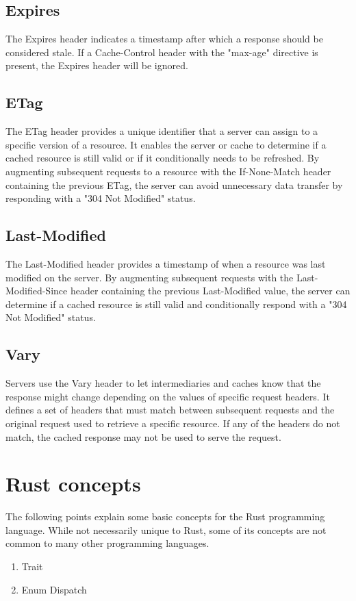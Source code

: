 \subsection{Expires} The Expires header indicates a timestamp after which a response should be considered stale. If a Cache-Control header with the "max-age" directive is present, the Expires header will be ignored\cite{rfc9111}.

\subsection{ETag} The ETag header provides a unique identifier that a server can assign to a specific version of a resource. It enables the server or cache to determine if a cached resource is still valid or if it conditionally needs to be refreshed. By augmenting subsequent requests to a resource with the If-None-Match header containing the previous ETag, the server can avoid unnecessary data transfer by responding with a "304 Not Modified" status\cite{rfc9111}.

\subsection{Last-Modified} The Last-Modified header provides a timestamp of when a resource was last modified on the server. By augmenting subsequent requests with the Last-Modified-Since header containing the previous Last-Modified value, the server can determine if a cached resource is still valid and conditionally respond with a "304 Not Modified" status\cite{rfc9111}.

\subsection{Vary} Servers use the Vary header to let intermediaries and caches know that the response might change depending on the values of specific request headers. It defines a set of headers that must match between subsequent requests and the original request used to retrieve a specific resource. If any of the headers do not match, the cached response may not be used to serve the request\cite{rfc9111}.

\section{Rust concepts}

The following points explain some basic concepts for the Rust programming language. While not necessarily unique to Rust, some of its concepts are not common to many other programming languages.
\begin{enumerate}
	\item Trait
	\item Enum Dispatch
\end{enumerate}

